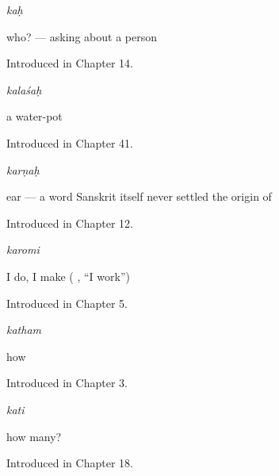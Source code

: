\noindent\begin{minipage}[t]{\linewidth}
\raggedright
\textbf{}\enspace\emph{kaḥ}\par
\small who? — asking about a person\par
\footnotesize Introduced in Chapter 14.
\end{minipage}\par\medskip

\noindent\begin{minipage}[t]{\linewidth}
\raggedright
\textbf{}\enspace\emph{kalaśaḥ}\par
\small a water-pot\par
\footnotesize Introduced in Chapter 41.
\end{minipage}\par\medskip

\noindent\begin{minipage}[t]{\linewidth}
\raggedright
\textbf{}\enspace\emph{karṇaḥ}\par
\small ear — a word Sanskrit itself never settled the origin of\par
\footnotesize Introduced in Chapter 12.
\end{minipage}\par\medskip

\noindent\begin{minipage}[t]{\linewidth}
\raggedright
\textbf{}\enspace\emph{karomi}\par
\small I do, I make ( , \textquotedblleft{}I work\textquotedblright{})\par
\footnotesize Introduced in Chapter 5.
\end{minipage}\par\medskip

\noindent\begin{minipage}[t]{\linewidth}
\raggedright
\textbf{}\enspace\emph{katham}\par
\small how\par
\footnotesize Introduced in Chapter 3.
\end{minipage}\par\medskip

\noindent\begin{minipage}[t]{\linewidth}
\raggedright
\textbf{}\enspace\emph{kati}\par
\small how many?\par
\footnotesize Introduced in Chapter 18.
\end{minipage}\par\medskip

